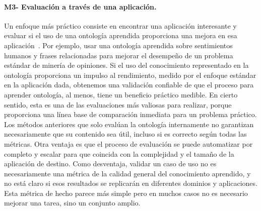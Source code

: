     \paragraph{M3- Evaluación a través de una aplicación.}
    Un enfoque más práctico consiste en encontrar una aplicación interesante y evaluar si el uso de una ontología aprendida proporciona una mejora en esa aplicación~\cite{gurevych2003semantic}.
    Por ejemplo, usar una ontología aprendida sobre sentimientos humanos y frases relacionadas para mejorar el desempeño de un problema estándar de minería de opiniones.
    Si el uso del conocimiento representado en la ontología proporciona un impulso al rendimiento, medido por el enfoque estándar en la aplicación dada, obtenemos una validación confiable de que el proceso para aprender ontología, al menos, tiene un beneficio práctico medible.
    En cierto sentido, esta es una de las evaluaciones más valiosas para realizar, porque proporciona una línea base de comparación inmediata para un problema práctico.
    Los métodos anteriores que solo evalúan la ontología internamente no garantizan necesariamente que su contenido sea útil, incluso si es correcto según todas las métricas.
    Otra ventaja es que el proceso de evaluación se puede automatizar por completo y escalar para que coincida con la complejidad y el tamaño de la aplicación de destino.
    Como desventaja, validar un caso de uso no es necesariamente una métrica de la calidad general del conocimiento aprendido, y no está claro si esos resultados se replicarán en diferentes dominios y aplicaciones.
    Esta métrica de hecho parece más simple pero en muchos casos no es necesario mejorar una tarea, sino un conjunto amplio.

